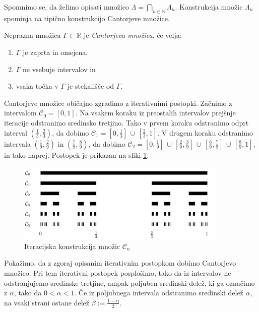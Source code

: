 \documentclass{isrmdelo}
\newcommand{\R}{\mathbb R}
\newcommand{\N}{\mathbb N}
\newcommand{\cantorset}{\mathcal{C}}
\begin{document}
\bigskip

Spomnimo se, da želimo opisati množico $\Lambda = \bigcap_{n \in \N} \Lambda_n$. Konstrukcija množic $\Lambda_n$ spominja na tipično konstrukcijo Cantorjeve množice.

\smallskip

\begin{definicija}
Neprazna množica $\Gamma \subset \R$ je \emph{Cantorjeva množica}, če velja:
\begin{enumerate}
    \item $\Gamma$ je zaprta in omejena,
    \item $\Gamma$ ne vsebuje intervalov in
    \item vsaka točka v $\Gamma$ je stekališče od $\Gamma$.
\end{enumerate}
\end{definicija}

Cantorjeve množice običajno zgradimo z iterativnimi postopki. Začnimo z intervalom $\cantorset_0 = [0, 1]$. Na vsakem koraku iz preostalih intervalov prejšnje iteracije odstranimo sredinsko tretjino. Tako v prvem koraku odstranimo odprt interval $(\frac{1}{3}, \frac{2}{3})$, da dobimo $\cantorset_1 = [0, \frac{1}{3}] \, \cup \, [\frac{2}{3}, 1]$. V drugem koraku odstranimo intervala $(\frac{1}{9}, \frac{2}{9})$ in $(\frac{7}{9}, \frac{8}{9})$, da dobimo $\cantorset_2 = [0, \frac{1}{9}] \, \cup \, [\frac{2}{9}, \frac{3}{9}] \, \cup \, [\frac{6}{9}, \frac{7}{9}] \, \cup \, [\frac{8}{9}, 1]$, in tako naprej. Postopek je prikazan na sliki \ref{fig:cantor_construction}.

\begin{figure}[h!]
\begin{center}
\includegraphics[width=0.9\textwidth]{img/cantor_set.png}
\end{center}
\caption{Iteracijska konstrukcija množic $\cantorset_n$}
\label{fig:cantor_construction}
\end{figure}

Pokažimo, da z zgoraj opisanim iterativnim postopkom dobimo Cantorjevo množico. Pri tem iterativni postopek posplošimo, tako da iz intervalov ne odstranjujemo sredinske tretjine, ampak poljuben sredinski delež, ki ga označimo z $\alpha$, tako da $0 < \alpha < 1$. Če iz poljubnega intervala odstranimo sredinski delež $\alpha$, na vsaki strani ostane delež $\beta := \frac{1-\alpha}{2}$. 
\end{document}
